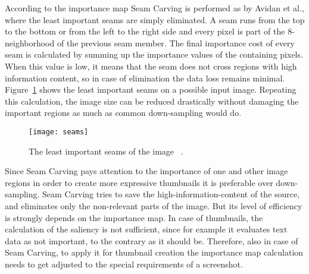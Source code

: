\documentclass[draft,final]{vutinfth} %
\begin{document}
	According to the importance map Seam Carving is performed as by Avidan et al.\cite{avidan2007seam}, where the least important seams are simply eliminated.
	A seam runs from the top to the bottom or from the left to the right side and every pixel is part of the 8-neighborhood of the previous seam member.
	The final importance cost of every seam is calculated by summing up the importance values of the containing pixels.
	When this value is low, it means that the seam does not cross regions with high information content, so in case of elimination the data loss remains minimal.
	Figure~\ref{fig:seamsDol} shows the least important seams on a possible input image.
	Repeating this calculation, the image size can be reduced drastically without damaging the important regions as much as common down-sampling would do.\par 
	\begin{figure}[H]
		\centering		
		\texttt{[image: seams]}
		\caption{The least important seams of the image ~\cite{avidan2007seam}.}
		\label{fig:seamsDol}
	\end{figure} 
	Since Seam Carving pays attention to the importance of one and other image regions in order to create more expressive thumbnails it is preferable over down-sampling.
	Seam Carving tries to save the high-information-content of the source, and eliminates only the non-relevant parts of the image.
	But its level of efficiency is strongly depends on the importance map.
	In case of thumbnails, the calculation of the saliency is not sufficient, since for example it evaluates text data as not important, to the contrary as it should be.
	Therefore, also in case of Seam Carving, to apply it for thumbnail creation the importance map calculation needs to get adjusted to the special requirements of a screenshot. 
	
\end{document}
